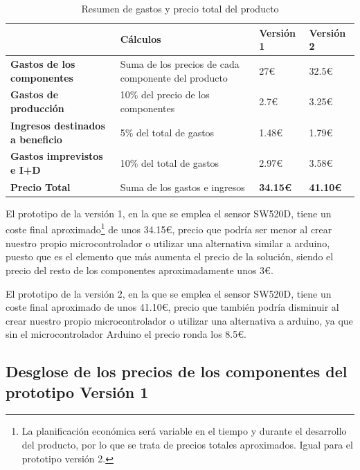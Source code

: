 \begin{table}[h!]
\centering
\begin{tabular}{ |m{4cm}|m{4cm}|m{2cm}|m{2cm}|  } 
\hline
\cellcolor[HTML]{B9E3F0}\textbf{} & \cellcolor[HTML]{B9E3F0}\textbf{Cálculos} & \cellcolor[HTML]{B9E3F0}\textbf{Versión 1}& \cellcolor[HTML]{B9E3F0}\textbf{Versión 2}\\

\hline
\cellcolor[HTML]{EFEFEF}\textbf{Gastos de los componentes}             & {Suma de los precios de cada componente del producto}   & 27€ & 32.5€\\
\hline
\cellcolor[HTML]{EFEFEF}\textbf{Gastos de producción}                & {10\% del precio de los componentes} & 2.7€ & 3.25€\\
\hline
\cellcolor[HTML]{EFEFEF}\textbf{Ingresos destinados a beneficio}                & {5\% del total de gastos} & 1.48€ & 1.79€\\
\hline
\cellcolor[HTML]{EFEFEF}\textbf{Gastos imprevistos e I+D} & {10\% del total de gastos} & 2.97€ & 3.58€\\
\hline
\cellcolor[HTML]{EFEFEF}\textbf{Precio Total} & {Suma de los gastos e ingresos} & \textbf{34.15€} & \textbf{41.10€}\\
\hline
\end{tabular}
\caption{Resumen de gastos y precio total del producto}
\end{table}

El prototipo de la versión 1, en la que se emplea el sensor SW520D, tiene un coste final aproximado\footnote{La planificación económica será variable en el tiempo y durante el desarrollo del producto, por lo que se trata de precios totales aproximados. Igual para el prototipo versión 2.} de unos 34.15€, precio que podría ser menor al crear nuestro propio microcontrolador o utilizar una alternativa similar a arduino, puesto que es el elemento que más aumenta el precio de la solución, siendo el precio del resto de los componentes aproximadamente unos 3€.

El prototipo de la versión 2, en la que se emplea el sensor SW520D, tiene un coste final aproximado de unos 41.10€, precio que también podría disminuir al crear nuestro propio microcontrolador o utilizar una alternativa a arduino, ya que sin el microcontrolador Arduino el precio ronda los 8.5€.


\subsection{Desglose de los precios de los componentes del prototipo Versión 1}

